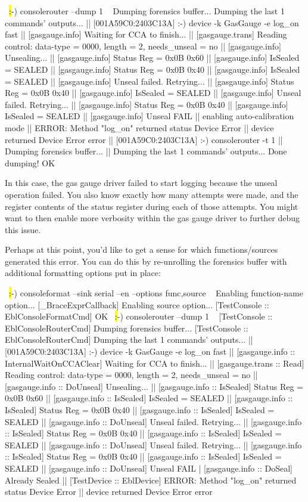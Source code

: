 \begin{LuaCode}
~\hl:-) consolerouter --dump 1 ~
Dumping forensics buffer...
Dumping the last 1 commands' outputs...
|| [001A59C0:2403C13A] :-) device -k GasGauge -e log_on fast
|| [gasgauge.info] Waiting for CCA to finish...
|| [gasgauge.trans] Reading control: data-type = 0000, length = 2, needs_unseal = no
|| [gasgauge.info] Unsealing...
|| [gasgauge.info] Status Reg = 0x0B 0x60
|| [gasgauge.info] IsSealed = SEALED
|| [gasgauge.info] Status Reg = 0x0B 0x40
|| [gasgauge.info] IsSealed = SEALED
|| [gasgauge.info] Unseal failed. Retrying...
|| [gasgauge.info] Status Reg = 0x0B 0x40
|| [gasgauge.info] IsSealed = SEALED
|| [gasgauge.info] Unseal failed. Retrying...
|| [gasgauge.info] Status Reg = 0x0B 0x40
|| [gasgauge.info] IsSealed = SEALED
|| [gasgauge.info] Unseal FAIL
|| enabling auto-calibration mode
|| ERROR: Method "log_on" returned status Device Error
|| device returned Device Error error
|| [001A59C0:2403C13A] :-) consolerouter -t 1
|| Dumping forensics buffer...
|| Dumping the last 1 commands' outputs...
Done dumping!
OK
\end{LuaCode}

In this case, the gas gauge driver failed to start logging because the unseal operation failed. You also know exactly how many attempts were made, and the 
register contents of the status register during each of those attempts. You might want to then enable more verbosity within the gas gauge 
driver to further debug this issue. 

Perhaps at this point, you'd like to get a sense for which functions/sources generated this error. You can do this by re-unrolling the forensics buffer with additional 
formatting options put in place:

\begin{LuaCode}
~\hl:-) consoleformat --sink serial --en --options func,source ~
Enabling function-name option...
[_BraceExprCallback] Enabling source option...
[TestConsole :: EblConsoleFormatCmd] OK 
~\hl:-) consolerouter --dump 1 ~
[TestConsole :: EblConsoleRouterCmd] Dumping forensics buffer...
[TestConsole :: EblConsoleRouterCmd] Dumping the last 1 commands' outputs...
|| [001A59C0:2403C13A] :-) device -k GasGauge -e log_on fast
|| [gasgauge.info :: InternalWaitOnCCAClear] Waiting for CCA to finish...
|| [gasgauge.trans :: Read] Reading control: data-type = 0000, length = 2, needs_unseal = no
|| [gasgauge.info :: DoUnseal] Unsealing...
|| [gasgauge.info :: IsSealed] Status Reg = 0x0B 0x60
|| [gasgauge.info :: IsSealed] IsSealed = SEALED
|| [gasgauge.info :: IsSealed] Status Reg = 0x0B 0x40
|| [gasgauge.info :: IsSealed] IsSealed = SEALED
|| [gasgauge.info :: DoUnseal] Unseal failed. Retrying...
|| [gasgauge.info :: IsSealed] Status Reg = 0x0B 0x40
|| [gasgauge.info :: IsSealed] IsSealed = SEALED
|| [gasgauge.info :: DoUnseal] Unseal failed. Retrying...
|| [gasgauge.info :: IsSealed] Status Reg = 0x0B 0x40
|| [gasgauge.info :: IsSealed] IsSealed = SEALED
|| [gasgauge.info :: DoUnseal] Unseal FAIL
| [gasgauge.info :: DoSeal] Already Sealed
|| [TestDevice :: EblDevice] ERROR: Method "log_on" returned status Device Error
|| device returned Device Error error
\end{LuaCode}

